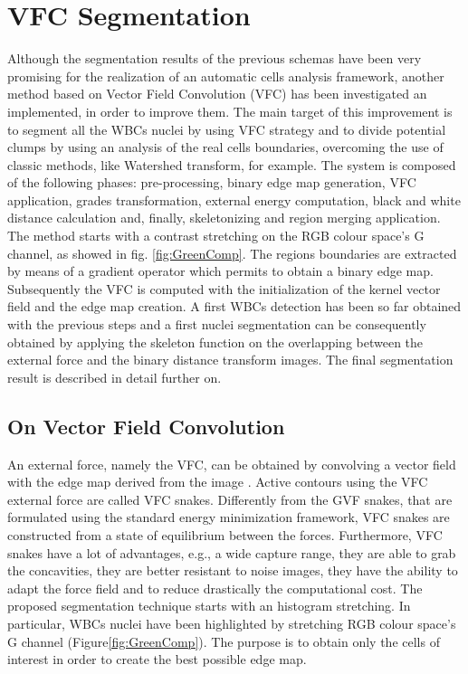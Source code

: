\documentclass[final,a4paper,12pt,english]{UnicaPhdThesis3}
\begin{document}
\section{VFC Segmentation} %
Although the segmentation results of the previous schemas have been very promising for the realization of an automatic cells analysis framework, another method based on Vector Field Convolution (VFC) has been investigated an implemented, in order to improve them.
The main target of this improvement is to segment all the WBCs nuclei by using VFC strategy and to divide potential clumps by using an analysis of the real cells boundaries, overcoming the use of classic methods, like Watershed transform, for example. 
The system is composed of the following phases: pre-processing, binary edge map generation, VFC \cite{Bing} application, grades transformation, external energy computation, black and white distance calculation and, finally, skeletonizing and region merging application. The method starts with a contrast stretching on the RGB colour space's G channel, as showed in fig. \ref{fig:GreenComp}. 
The regions boundaries are extracted by means of a gradient operator which permits to obtain a binary edge map. Subsequently the VFC is computed with the initialization of the kernel vector field and the edge map creation. A first WBCs detection has been so far obtained with the previous steps and a first nuclei segmentation can be consequently obtained by applying the skeleton function on the overlapping between the external force and the binary distance transform images. The final segmentation result is described in detail further on.

\subsection{On Vector Field Convolution}
An external force, namely the VFC, can be obtained by convolving a vector field with the edge map derived from the image \cite{Bing}. 
Active contours using the VFC external force are called VFC snakes. Differently from the GVF \cite{Xu} snakes, that are formulated using the standard energy minimization framework, VFC snakes are constructed from a state of equilibrium between the forces. Furthermore, VFC snakes have a lot of advantages, e.g., a wide capture range, they are able to grab the concavities, they are better resistant to noise images, they have the ability to adapt the force field and to reduce drastically the computational cost.
The proposed segmentation technique starts with an histogram stretching. In particular, WBCs nuclei have been highlighted by stretching RGB colour space's G channel (Figure\ref{fig:GreenComp}).
The purpose is to obtain only the cells of interest in order to create the best possible edge map.
\end{document}
